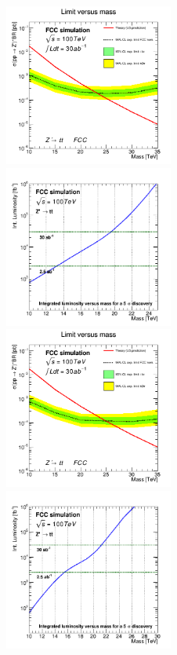 \documentclass{cernrep}
\begin{document}
\begin{figure}[!htb]\centering
\includegraphics[width=0.495\textwidth]{Fig/Zptt/cut/lim_Zprime_tt_fcc_v02.png}
\includegraphics[width=0.495\textwidth]{Fig/Zptt/cut/DiscoveryPotential_tt_rootStyle.png}
\includegraphics[width=0.495\textwidth]{Fig/Zptt/tagger/lim_Zprime_tt_fcc_v02.png}
\includegraphics[width=0.495\textwidth]{Fig/Zptt/tagger/DiscoveryPotential_tt_TC2_rootStyle.png}

\end{figure}
\end{document}
